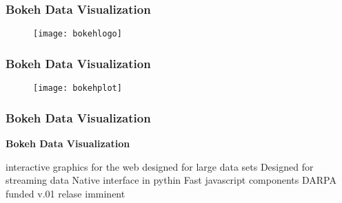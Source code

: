 \documentclass[MASTER.tex]{subfiles}
\begin{document}
 \frametitle{Bokeh Data Visualization}
  \begin{figure}
\centering
\texttt{[image: bokehlogo]}
\end{figure}

 
 
 \frametitle{Bokeh Data Visualization}

\begin{figure}
\centering
\texttt{[image: bokehplot]}

\end{figure}
 
 
 
 \frametitle{Bokeh Data Visualization}
 \textbf{Bokeh Data Visualization}
  
   interactive graphics for the web
   designed for large data sets
   Designed for streaming data
   Native interface in pythin
   Fast javascript components
   DARPA funded
   v.01 relase imminent
  
 
 
\end{document}
